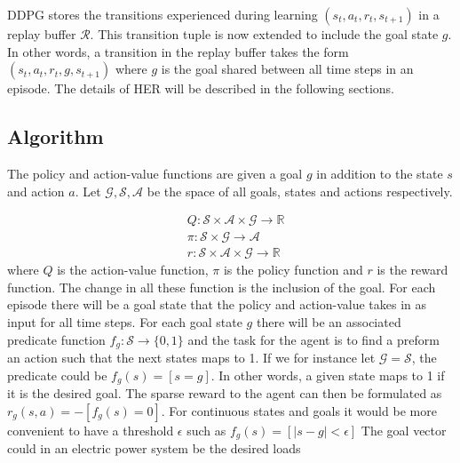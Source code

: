\documentclass[class=book, crop=false]{standalone}
\begin{document}
DDPG stores the transitions experienced during learning $(s_{t},a_{t},r_{t},s_{t+1})$ in a replay buffer $\mathcal{R}$. This transition tuple is now extended to include the goal state $g$. In other words, a transition in the replay buffer takes the form $(s_{t},a_{t},r_{t},g,s_{t+1})$ where $g$ is the goal shared between all time steps in an episode. The details of HER will be described in the following sections.

\subsection{Algorithm}

The policy and action-value functions are given a goal $g$ in addition to the state $s$ and action $a$. Let $\mathcal{G}, \mathcal{S}, \mathcal{A}$ be the space of all goals, states and actions respectively. 

\begin{equation}
   \begin{aligned}
   \label{eq:theory:her_function_with_goal}
    &Q: \mathcal{S} \times \mathcal{A} \times \mathcal{G} \to \mathbb{R}
    \\
    &\pi: \mathcal{S} \times \mathcal{G} \to \mathcal{A}
    \\
    &r: \mathcal{S} \times \mathcal{A} \times \mathcal{G} \to \mathbb{R}
    \end{aligned} 
\end{equation}
where $Q$ is the action-value function, $\pi$ is the policy function and $r$ is the reward function. The change in all these function is the inclusion of the goal. For each episode there will be a goal state that the policy and action-value takes in as input for all time steps. For each goal state $g$ there will be an associated predicate function $f_{g}: \mathcal{S} \to \{0,1\}$ and the task for the agent is to find a preform an action such that the next states maps to 1. If we for instance let $\mathcal{G} = \mathcal{S}$, the predicate could be $f_{g}(s) = [s=g]$. In other words, a given state maps to 1 if it is the desired goal. The sparse reward to the agent can then be formulated as $r_{g}(s,a) = -[f_{g}(s)=0]$. For continuous states and goals it would be more convenient to have a threshold $\epsilon$ such as $f_{g}(s) = [|s-g| < \epsilon]$ The goal vector could in an electric power system be the desired loads
\end{document}
